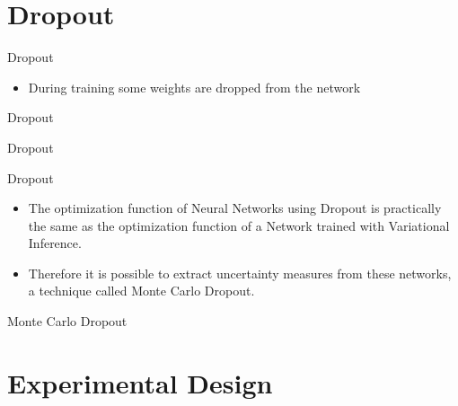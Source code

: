 \documentclass[10pt]{beamer}
\begin{document}
\section{Dropout}

\begin{frame}[fragile]{Dropout}
\begin{itemize}
\item During training some weights are dropped from the network
\end{itemize}
\end{frame}

\begin{frame}[fragile]{Dropout}
    
\end{frame}

\begin{frame}[fragile]{Dropout}
    
\end{frame}

\begin{frame}[fragile]{Dropout}
\begin{itemize}
    \item The optimization function of Neural Networks using \alert{Dropout} is practically the same
        as the optimization function of a Network trained with Variational
        Inference.
    \vspace{0.5cm}
    \item Therefore it is possible to extract uncertainty measures from these
        networks, a technique called \alert{Monte Carlo Dropout}.
\end{itemize}
\end{frame}

\begin{frame}[fragile]{Monte Carlo Dropout}
    
\end{frame}

\section{Experimental Design}
\end{document}
